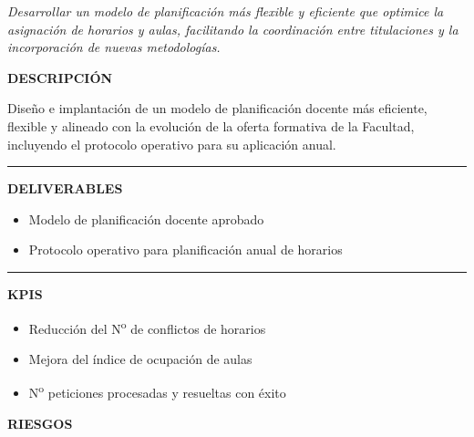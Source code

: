 \documentclass[11pt,a4paper]{scrreprt}
\newcommand{\fieldlabel}[1]{%
  {\footnotesize\sffamily\bfseries\color{mutedcolor}\MakeUppercase{#1}}\par\nopagebreak[4]
}
\newcommand{\fieldsep}{\vspace{3pt}\noindent\textcolor{bordercolor}{\rule{\linewidth}{0.4pt}}\vspace{3pt}\par}
\begin{document}
\newpage
{}
{\small\color{mutedcolor}\itshape Desarrollar un modelo de planificación más flexible y eficiente que optimice la asignación de horarios y aulas, facilitando la coordinación entre titulaciones y la incorporación de nuevas metodologías.}\par\vspace{6pt}

\begin{tcolorbox}[pabox={espcolor}{PA5.1 \enspace\textbullet\enspace Diseño del nuevo modelo de planificación académica}]

\fieldlabel{Descripci\'on}
{\small Diseño e implantación de un modelo de planificación docente más eficiente, flexible y alineado con la evolución de la oferta formativa de la Facultad, incluyendo el protocolo operativo para su aplicación anual.}\par
\fieldsep
\fieldlabel{Deliverables}
{\small \begin{itemize}[noitemsep,topsep=2pt]
\item Modelo de planificación docente aprobado
\item Protocolo operativo para planificación anual de horarios
\end{itemize}}\par
\fieldsep
\fieldlabel{KPIs}
{\small \begin{itemize}[noitemsep,topsep=2pt]
\item Reducción del N\textsuperscript{o} de conflictos de horarios
\item Mejora del índice de ocupación de aulas
\item N\textsuperscript{o} peticiones procesadas y resueltas con éxito
\end{itemize}}\par
\end{tcolorbox}
\begin{tcolorbox}[riskbox]
{\footnotesize\sffamily\bfseries\color{red!50!black} RIESGOS}\par{}
\end{tcolorbox}
\end{document}
